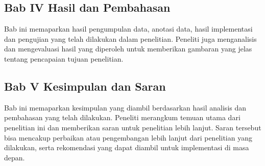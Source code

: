 \subsection{Bab IV Hasil dan Pembahasan}
Bab ini memaparkan hasil pengumpulan data, anotasi data, hasil implementasi dan pengujian yang telah dilakukan dalam penelitian. Peneliti juga menganalisis dan mengevaluasi hasil yang diperoleh untuk memberikan gambaran yang jelas tentang pencapaian tujuan penelitian.

\subsection{Bab V Kesimpulan dan Saran}
Bab ini memaparkan kesimpulan yang diambil berdasarkan hasil analisis dan pembahasan yang telah dilakukan. Peneliti merangkum temuan utama dari penelitian ini dan memberikan saran untuk penelitian lebih lanjut. Saran tersebut bisa mencakup perbaikan atau pengembangan lebih lanjut dari penelitian yang dilakukan, serta rekomendasi yang dapat diambil untuk implementasi di masa depan.
\clearpage
